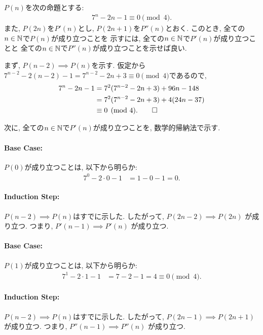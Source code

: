 \begin{proof*}
  $P(n)$を次の命題とする:
  \begin{align*}
    7^n-2n-1\equiv 0\pmod{4}
    .
  \end{align*}
  また, $P(2n)$を$P'(n)$とし,
  $P(2n+1)$を$P''(n)$とおく.
  このとき,
  全ての$n\in\mathbb{N}$で$P(n)$が成り立つことを
  示すには,
  全ての$n\in\mathbb{N}$で$P'(n)$が成り立つことと
  全ての$n\in\mathbb{N}$で$P''(n)$が成り立つことを示せば良い.

  まず,
  $P(n-2)\implies P(n)$を示す.
  仮定から$7^{n-2}-2(n-2)-1=7^{n-2}-2n+3\equiv 0\pmod{4}$であるので,
  \begin{align*}
    7^n-2n-1
    &=7^2(7^{n-2}-2n+3)+96n-148\\
    &=7^2(7^{n-2}-2n+3)+4(24n-37)\\
    &\equiv 0\pmod{4}
    .\qedhere
  \end{align*}

  
  次に,
  全ての$n\in\mathbb{N}$で$P'(n)$が成り立つことを,
  数学的帰納法で示す.
  \paragraph{Base Case:}
  $P(0)$が成り立つことは, 以下から明らか:
  \begin{align*}
    7^0-2\cdot 0-1&=1-0-1= 0.
  \end{align*}
    
  \paragraph{Induction Step:}
  $P(n-2)\implies P(n)$はすでに示した.
  したがって,
  $P(2n-2)\implies P(2n)$
  が成り立つ.
  つまり,
  $P'(n-1)\implies P'(n)$
  が成り立つ.

  \paragraph{Base Case:}
  $P(1)$が成り立つことは, 以下から明らか:
  \begin{align*}
    7^1-2\cdot 1-1&=7-2-1=4\equiv 0\pmod{4}.
  \end{align*}
    
  \paragraph{Induction Step:}
  $P(n-2)\implies P(n)$はすでに示した.
  したがって,
  $P(2n-1)\implies P(2n+1)$
  が成り立つ.
  つまり,
  $P''(n-1)\implies P''(n)$
  が成り立つ.
\end{proof*}

